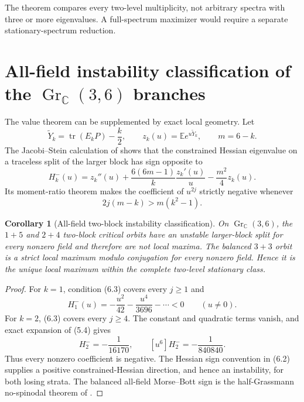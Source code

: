 \documentclass[11pt]{article}
\newtheorem{corollary}[theorem]{Corollary}
\newcommand{\E}{\mathbb E}
\newcommand{\C}{\mathbb C}
\newcommand{\tr}{\operatorname{tr}}
\newcommand{\Gr}{\operatorname{Gr}}
\begin{document}
The theorem compares every two-level multiplicity, not arbitrary spectra
with three or more eigenvalues.  A full-spectrum maximizer would require a
separate stationary-spectrum reduction.

\section{All-field instability classification of the \texorpdfstring{$\Gr_{\C}(3,6)$}{GrC(3,6)} branches}

The value theorem can be supplemented by exact local geometry.  Let
\begin{equation}
 \widetilde Y_k=\tr(E_kP)-\frac{k}{2},\qquad
 z_k(u)=\E e^{u\widetilde Y_k},\qquad m=6-k.                 \tag{6.1}
\end{equation}
The Jacobi--Stein calculation of \cite{ErikssonMorseBott2026} shows that the
constrained Hessian eigenvalue on a traceless split of the larger block has
sign opposite to
\begin{equation}
 H_k^-(u)=z_k''(u)+\frac{6(6m-1)}{k}\frac{z_k'(u)}u
                  -\frac{m^2}{4}z_k(u).                    \tag{6.2}
\end{equation}
Its moment-ratio theorem makes the coefficient of $u^{2j}$ strictly negative
whenever
\begin{equation}
 2j(m-k)>m(k^2-1).                                         \tag{6.3}
\end{equation}

\begin{corollary}[All-field two-block instability classification]
\label{cor:morse}
On $\Gr_{\C}(3,6)$, the $1+5$ and $2+4$ two-block critical orbits have an
unstable larger-block split for every nonzero field and therefore are not
local maxima.  The balanced $3+3$ orbit is a strict local maximum modulo
conjugation for every nonzero field.  Hence it is the unique local maximum
within the complete two-level stationary class.
\end{corollary}

\begin{proof}
For $k=1$, condition (6.3) covers every $j\ge1$ and
\begin{equation}
 H_1^-(u)=-\frac{u^2}{42}-\frac{u^4}{3696}-\cdots<0
 \qquad(u\ne0).                                            \tag{6.4}
\end{equation}
For $k=2$, (6.3) covers every $j\ge4$.  The constant and quadratic terms
vanish, and exact expansion of (5.4) gives
\begin{equation}
 [u^4]H_2^-=-\frac1{16170},\qquad
 [u^6]H_2^-=-\frac1{840840}.                               \tag{6.5}
\end{equation}
Thus every nonzero coefficient is negative.  The Hessian sign convention in
(6.2) supplies a positive constrained-Hessian direction, and hence an
instability, for both losing strata.  The
balanced all-field Morse--Bott sign is the half-Grassmann no-spinodal theorem
of \cite{ErikssonMorseBott2026}.
\end{proof}
\end{document}
